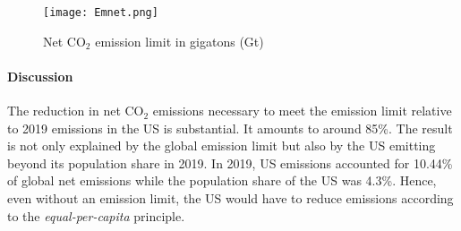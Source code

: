 % 


%			

\begin{figure}
	\caption{Net CO$_2$ emission limit in gigatons  (Gt)}\label{fig:emlimit}
	\texttt{[image: Emnet.png]}
\end{figure}

\paragraph{Discussion}
The reduction in net CO$_2$ emissions necessary to meet the emission limit relative to 2019 emissions in the US  is substantial. It amounts to around 85\%. The result is not only explained by the global emission limit but also by the US emitting beyond its population share in 2019. In 2019, US emissions accounted for 10.44\% of global net emissions while the population share of the US was 4.3\%. Hence, even without an emission limit, the US would have to reduce emissions according to the \textit{equal-per-capita} principle.

